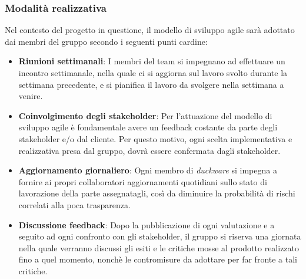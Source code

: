 \subsubsection{Modalità realizzativa}
Nel contesto del progetto in questione, il modello di sviluppo agile sarà adottato dai membri del gruppo secondo i seguenti punti cardine:
\begin{itemize}
	\item \textbf{Riunioni settimanali}: I membri del team si impegnano ad effettuare un incontro settimanale, nella quale ci si aggiorna sul lavoro svolto durante la settimana precedente, e si pianifica il lavoro da svolgere nella settimana a venire.
	\item \textbf{Coinvolgimento degli stakeholder}: Per l'attuazione del modello di sviluppo agile è fondamentale avere un feedback costante da parte degli stakeholder e/o dal cliente. Per questo motivo, ogni scelta implementativa e realizzativa presa dal gruppo, dovrà essere confermata dagli stakeholder.
	\item \textbf{Aggiornamento giornaliero}: Ogni membro di \emph{duckware} si impegna a fornire ai propri collaboratori aggiornamenti quotidiani sullo stato di lavorazione della parte assegnatagli, così da diminuire la probabilità di rischi correlati alla poca trasparenza.
	\item \textbf{Discussione feedback}: Dopo la pubblicazione di ogni valutazione e a seguito ad ogni confronto con gli stakeholder, il gruppo si riserva una giornata nella quale verranno discussi gli esiti e le critiche mosse al prodotto realizzato fino a quel momento, nonchè le contromisure da adottare per far fronte a tali critiche. 
\end{itemize}

